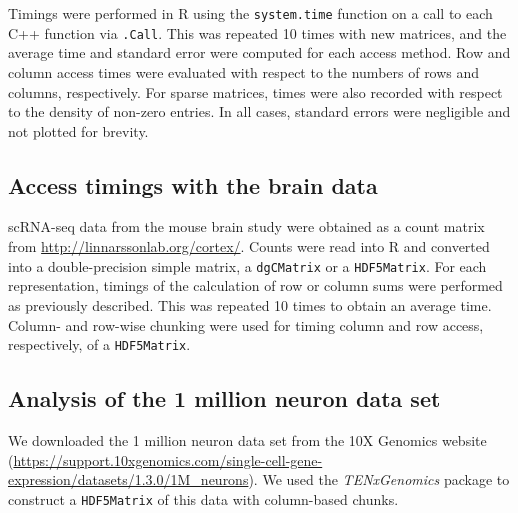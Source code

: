 \documentclass[10pt,letterpaper]{article}
\newcommand{\code}[1]{\texttt{#1}}
\begin{document}
Timings were performed in R using the \code{system.time} function on a call to each C++ function via \code{.Call}. 
This was repeated 10 times with new matrices, and the average time and standard error were computed for each access method. 
Row and column access times were evaluated with respect to the numbers of rows and columns, respectively.
For sparse matrices, times were also recorded with respect to the density of non-zero entries.
In all cases, standard errors were negligible and not plotted for brevity.

\subsection*{Access timings with the brain data}
scRNA-seq data from the mouse brain study \cite{zeisel2015brain} were obtained as a count matrix from \url{http://linnarssonlab.org/cortex/}.
Counts were read into R and converted into a double-precision simple matrix, a \code{dgCMatrix} or a \code{HDF5Matrix}.
For each representation, timings of the calculation of row or column sums were performed as previously described.
This was repeated 10 times to obtain an average time.
Column- and row-wise chunking were used for timing column and row access, respectively, of a \code{HDF5Matrix}.

\subsection*{Analysis of the 1 million neuron data set}
We downloaded the 1 million neuron data set from the 10X Genomics website (\url{https://support.10xgenomics.com/single-cell-gene-expression/datasets/1.3.0/1M_neurons}).
We used the \textit{TENxGenomics} package to construct a \code{HDF5Matrix} of this data with column-based chunks.


{\small
    
    
}
\end{document}

